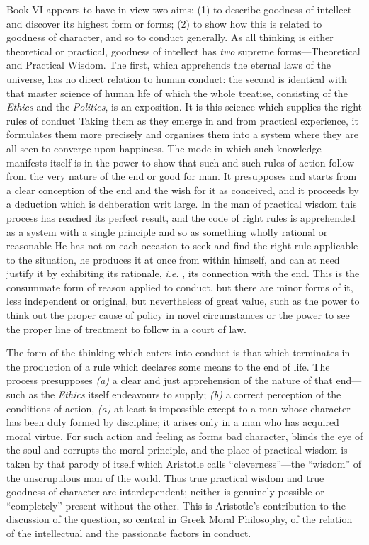 Book VI appears to have in view two aims: (1) to describe goodness of intellect
and discover its highest form or forms; (2) to show how this is related to
goodness of character, and so to conduct generally. As all thinking is either
theoretical or practical, goodness of intellect has \emph{two} supreme
forms—Theoretical and Practical Wisdom. The first, which apprehends the
eternal laws of the universe, has no direct relation to human conduct: the
second is identical with that master science of human life of which the whole
treatise, consisting of the \emph{Ethics} and the \emph{Politics}, is an
exposition. It is this science which supplies the right rules of conduct Taking
them as they emerge in and from practical experience, it formulates them more
precisely and organises them into a system where they are all seen to converge
upon happiness. The mode in which such knowledge manifests itself is in the
power to show that such and such rules of action follow from the very nature of
the end or good for man. It presupposes and starts from a clear conception of
the end and the wish for it as conceived, and it proceeds by a deduction which
is dehberation writ large. In the man of practical wisdom this process has
reached its perfect result, and the code of right rules is apprehended as a
system with a single principle and so as something wholly rational or
reasonable He has not on each occasion to seek and find the right rule
applicable to the situation, he produces it at once from within himself, and
can at need justify it by exhibiting its rationale, \emph{i.e.} , its
connection with the end. This is the consummate form of reason applied to
conduct, but there are minor forms of it, less independent or original, but
nevertheless of great value, such as the power to think out the proper cause of
policy in novel circumstances or the power to see the proper line of treatment
to follow in a court of law.

The form of the thinking which enters into conduct is that which terminates in
the production of a rule which declares some means to the end of life. The
process presupposes \emph{(a)} a clear and just apprehension of the nature of
that end—such as the \emph{Ethics} itself endeavours to supply;
\emph{(b)} a correct perception of the conditions of action, \emph{(a)} at
least is impossible except to a man whose character has been duly formed by
discipline; it arises only in a man who has acquired moral virtue. For such
action and feeling as forms bad character, blinds the eye of the soul and
corrupts the moral principle, and the place of practical wisdom is taken by
that parody of itself which Aristotle calls “cleverness”—the
“wisdom” of the unscrupulous man of the world. Thus true practical
wisdom and true goodness of character are interdependent; neither is genuinely
possible or “completely” present without the other. This is
Aristotle’s contribution to the discussion of the question, so central in
Greek Moral Philosophy, of the relation of the intellectual and the passionate
factors in conduct.

